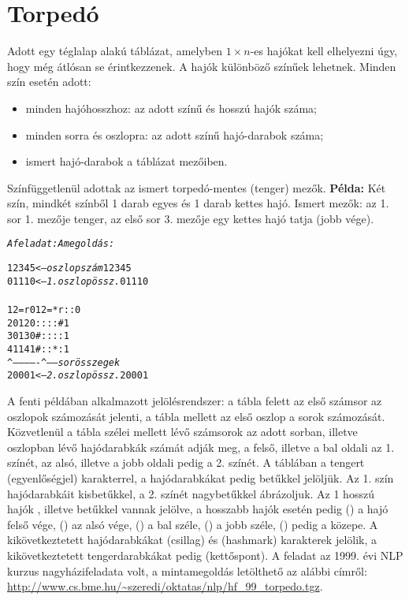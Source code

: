 \section{Torpedó}

Adott egy téglalap alakú táblázat, amelyben $1 \times n$-es hajókat kell elhelyezni
úgy, hogy még átlósan se érintkezzenek. A hajók különböző színűek lehetnek. Minden
szín esetén adott:
\begin{itemize}
\item minden hajóhosszhoz: az adott színű és hosszú hajók száma;
\item minden sorra és oszlopra: az adott színű hajó-darabok száma;
\item ismert hajó-darabok a táblázat mezőiben.
\end{itemize}
Színfüggetlenül adottak az ismert torpedó-mentes (tenger) mezők.
\br
{\bf Példa:} Két szín, mindkét színből 1 darab egyes és 1 darab kettes hajó.
Ismert mezők: az 1. sor 1. mezője tenger, az első sor 3. mezője egy kettes
hajó tatja (jobb vége).

\begin{alltt}
     {\rm \em A feladat:}                                     {\rm \em A megoldás:}
\end{alltt}
\begin{alltt}
      1 2 3 4 5     <-- {\em oszlopszám     }              1 2 3 4 5
      0 1 1 1 0     <-- {\em 1. oszlopössz. }              0 1 1 1 0
                        {\em                }
1  2  =   r      0      {\em                }        1  2  = * r : :  0
2  0             1      {\em                }        2  0  : : : : #  1
3  0             1      {\em                }        3  0  # : : : :  1
4  1             1      {\em                }        4  1  # : : * :  1
   ^-------------^------{\em sorösszegek    }
      2 0 0 0 1     <-- {\em 2. oszlopössz. }              2 0 0 0 1
\end{alltt}

A fenti példában alkalmazott jelölésrendszer: a tábla felett az első számsor az
oszlopok számozását jelenti, a tábla mellett az első oszlop a sorok számozását.
Közvetlenül a tábla szélei mellett lévő számsorok az adott sorban, illetve oszlopban
lévő hajódarabkák számát adják meg, a felső, illetve a bal oldali az 1. színét,
az alsó, illetve a jobb oldali pedig a 2. színét. A táblában a tengert \cd{=}
(egyenlőségjel) karakterrel, a hajódarabkákat pedig betűkkel jelöljük. Az 1. szín
hajódarabkáit kisbetűkkel, a 2. színét nagybetűkkel ábrázoljuk. Az 1 hosszú hajók
, illetve  betűkkel vannak jelölve, a hosszabb hajók esetén pedig 
() a hajó felső vége,  () az alsó vége,  () a bal széle,
 () a jobb széle,  () pedig a közepe. A kikövetkeztetett
hajódarabkákat \cd{*} (csillag) és \cd{\#} (hashmark) karakterek jelölik, a
kikövetkeztetett tengerdarabkákat pedig \cd{:} (kettőspont).
\br
A feladat az 1999. évi NLP kurzus nagyházifeladata volt, a mintamegoldás letölthető
az alábbi címről: \url{http://www.cs.bme.hu/~szeredi/oktatas/nlp/hf_99_torpedo.tgz}.

